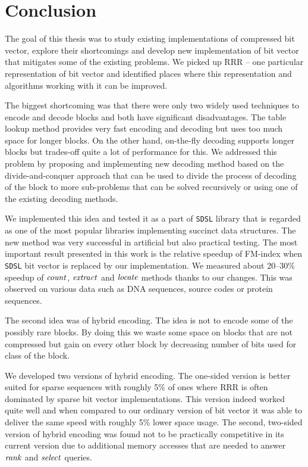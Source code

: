 \chapter*{Conclusion}  %

The goal of this thesis was to study existing implementations of compressed
bit vector, explore their shortcomings and develop new implementation of bit
vector that mitigates some of the existing problems. We picked up RRR -- one
particular representation of bit vector and identified places where this
representation and algorithms working with it can be improved.

The biggest shortcoming was that there were only two widely used techniques to
encode and decode blocks and both have significant disadvantages. The table lookup
method provides very fast encoding and decoding but uses too much space for longer
blocks. On the other hand, on-the-fly decoding supports longer blocks but
trades-off quite a lot of performance for this. We addressed this problem by
proposing and implementing new decoding method based on the divide-and-conquer
approach that can be used to divide the process of decoding of the block to more
sub-problems that can be solved recursively or using one of the existing decoding
methods.

We implemented this idea and tested it as a part of \texttt{SDSL} library that is
regarded as one of the most popular libraries implementing succinct data structures.
The new method was very successful in artificial but also practical testing. The most
important result presented in this work is the relative speedup of FM-index when
\texttt{SDSL} bit vector is replaced by our implementation. We measured about 20--30\%
speedup of $\mathit{count}$, $\mathit{extract}$ and $\mathit{locate}$ methods thanks to our changes. This
was observed on various data such as DNA sequences, source codes or protein sequences.

The second idea was of hybrid encoding. The idea is not to encode some of the possibly rare
blocks. By doing this we waste some space on blocks that are not compressed but gain
on every other block by decreasing number of bits used for class of the block.

We developed two versions of hybrid encoding. The one-sided version is better
suited for sparse sequences with roughly 5\% of ones where RRR is often dominated by sparse
bit vector implementations. This version indeed worked quite well and when compared to our
ordinary version of bit vector it was able to deliver the same speed with roughly 5\% lower
space usage. The second, two-sided version of hybrid encoding was found not to be practically
competitive in its current version due to additional memory accesses that are needed to answer
$\mathit{rank}$ and $\mathit{select}$ queries. 

